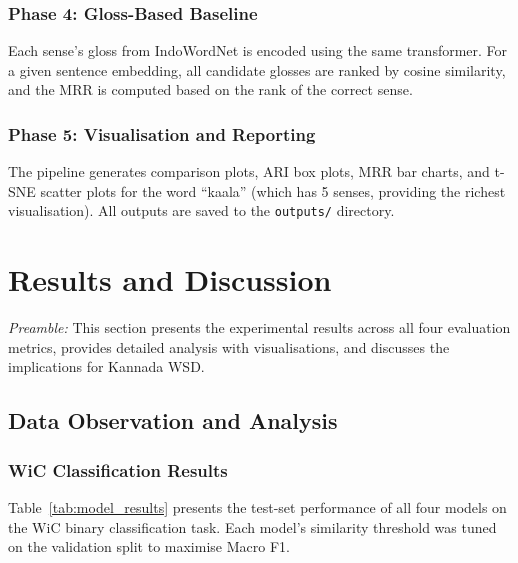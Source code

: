 \documentclass[12pt,a4paper,oneside]{article}
\begin{document}
\subsubsection{Phase 4: Gloss-Based Baseline}

Each sense's gloss from IndoWordNet is encoded using the same transformer. For a given sentence embedding, all candidate glosses are ranked by cosine similarity, and the MRR is computed based on the rank of the correct sense.

\subsubsection{Phase 5: Visualisation and Reporting}

The pipeline generates comparison plots, ARI box plots, MRR bar charts, and t-SNE scatter plots for the word ``kaala'' (which has 5 senses, providing the richest visualisation). All outputs are saved to the \texttt{outputs/} directory.

\clearpage

\section{Results and Discussion}

\textit{Preamble:} This section presents the experimental results across all four evaluation metrics, provides detailed analysis with visualisations, and discusses the implications for Kannada WSD.

\subsection{Data Observation and Analysis}

\subsubsection{WiC Classification Results}

Table~\ref{tab:model_results} presents the test-set performance of all four models on the WiC binary classification task. Each model's similarity threshold was tuned on the validation split to maximise Macro F1.
\end{document}
